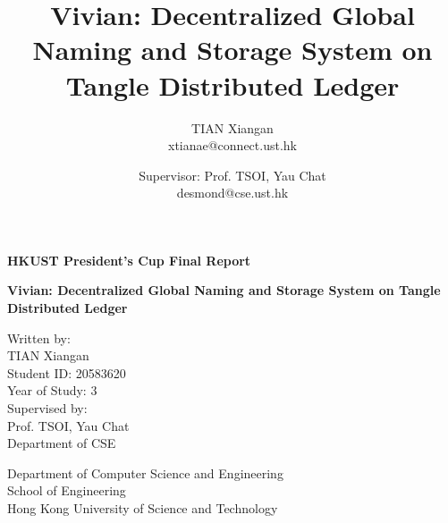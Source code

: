 \documentclass[conference, 10pt]{IEEEtran}
\begin{document}
\begin{titlepage}
    \begin{center}
        \vspace*{2cm}

        \LARGE
        \textbf{HKUST President's Cup Final Report}
        \vspace{0.5cm}

        \Huge
        \textbf{Vivian: Decentralized Global Naming and Storage System on Tangle Distributed Ledger}

        \vfill

        \Large
        Written by: \\
        \vspace{0.2cm}
        TIAN Xiangan \\
        \vspace{0.2cm}
        Student ID: 20583620 \\
        \vspace{0.2cm}
        Year of Study: 3 \\
        \vspace{1.5cm}
        Supervised by: \\

        \vspace{0.2cm}
        Prof. TSOI, Yau Chat \\
        \vspace{0.2cm}
        Department of CSE


        \vfill

        \vspace{0.8cm}

        \large
        Department of Computer Science and Engineering \\
        \vspace{0.15cm}
        School of Engineering \\
        \vspace{0.15cm}
        Hong Kong University of Science and Technology

    \end{center}
\end{titlepage}

\title{Vivian: Decentralized Global Naming and Storage System on Tangle Distributed Ledger}

\author{
    TIAN Xiangan \\
    xtianae@connect.ust.hk
    \and
    Supervisor: Prof. TSOI, Yau Chat \\
    desmond@cse.ust.hk
}
\end{document}
